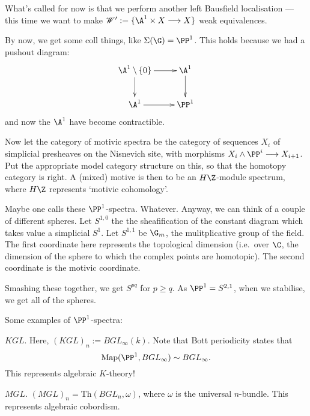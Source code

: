 \documentclass[11pt]{article}
\begin{document}
What's called for now is that we perform another left Bausfield localisation --- this time we want to make $\scrW':=\{\A^1\times X\to X\}$ weak equivalences.

By now, we get some coll things, like $\Sigma(\G)=\PP^1$. This holds because we had a pushout diagram:
\[\xymatrix{\ar[d]\A^1\setminus\{0\}\ar[r]&\A^1\ar[d]\\
\A^1\ar[r]&\PP^1
}\]
and now the $\A^1$ have become contractible.

Now let the category of motivic spectra be the category of sequences $X_i$ of simplicial presheaves on the Nisnevich site, with morphisms $X_i\wedge\PP^i\to X_{i+1}$. Put the appropriate model category structure on this, so that the homotopy category is right. A (mixed) motive is then to be an $H\Z$-module spectrum, where $H\Z$ represents `motivic cohomology'.

Maybe one calls these $\PP^1$-spectra. Whatever. Anyway, we can think of a couple of different spheres. Let $S^{1,0}$ the the sheafification of the constant diagram which takes value a simplicial $S^1$. Let $S^{1,1}$ be $\G_m$, the mulitplicative group of the field. The first coordinate here represents the topological dimension (i.e.\ over $\C$, the dimension of the sphere to which the complex points are homotopic). The second coordinate is the motivic coordinate. 

Smashing these together, we get $S^{pq}$ for $p\geq q$. As $\PP^1=S^{2,1}$, when we stabilise, we get all of the spheres.

Some examples of $\PP^1$-spectra:
\begin{itemise}
\item $KGL$. Here, $(KGL)_n:=BGL_\infty(k)$. Note that Bott periodicity states that 
\[\Map(\PP^1,BGL_\infty)\sim BGL_\infty.\]
This represents algebraic $K$-theory!
\item $MGL$. $(MGL)_n=\text{Th}(BGL_n,\omega)$, where $\omega$ is the universal $n$-bundle. This represents algebraic cobordism.
\end{itemise}
\end{document}
